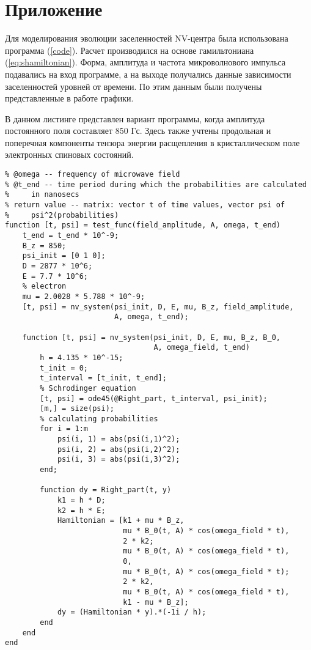 \newpage
\chapter*{Приложение}
Для моделирования эволюции заселенностей NV-центра была использована
программа (\ref{code}). Расчет производился на основе
гамильтониана (\ref{eq:shamiltonian}). Форма, амплитуда и частота микроволнового
импульса подавались на вход программе, а на выходе получались данные
зависимости заселенностей уровней от времени. По этим данным были
получены представленные в работе графики.

В данном листинге представлен вариант программы, когда амплитуда
постоянного поля составляет 850 Гс. Здесь также учтены продольная и
поперечная компоненты тензора энергии расщепления в кристаллическом
поле электронных спиновых состояний.
\begin{lstlisting}[label=code, caption=NV-center model]
% @field_amplitude -- function(t) of amplitude of microwave field
% @omega -- frequency of microwave field
% @t_end -- time period during which the probabilities are calculated
%     in nanosecs
% return value -- matrix: vector t of time values, vector psi of
%     psi^2(probabilities)
function [t, psi] = test_func(field_amplitude, A, omega, t_end)
    t_end = t_end * 10^-9;
    B_z = 850;
    psi_init = [0 1 0];
    D = 2877 * 10^6;
    E = 7.7 * 10^6;
    % electron
    mu = 2.0028 * 5.788 * 10^-9;
    [t, psi] = nv_system(psi_init, D, E, mu, B_z, field_amplitude, 
                         A, omega, t_end);

    function [t, psi] = nv_system(psi_init, D, E, mu, B_z, B_0, 
                                  A, omega_field, t_end)
        h = 4.135 * 10^-15;
        t_init = 0;
        t_interval = [t_init, t_end];
        % Schrodinger equation    
        [t, psi] = ode45(@Right_part, t_interval, psi_init);
        [m,] = size(psi);
        % calculating probabilities
        for i = 1:m
            psi(i, 1) = abs(psi(i,1)^2);
            psi(i, 2) = abs(psi(i,2)^2);
            psi(i, 3) = abs(psi(i,3)^2);
        end;
    
        function dy = Right_part(t, y)
            k1 = h * D;
            k2 = h * E;
            Hamiltonian = [k1 + mu * B_z, 
                           mu * B_0(t, A) * cos(omega_field * t), 
                           2 * k2; 
                           mu * B_0(t, A) * cos(omega_field * t), 
                           0, 
                           mu * B_0(t, A) * cos(omega_field * t);
                           2 * k2, 
                           mu * B_0(t, A) * cos(omega_field * t), 
                           k1 - mu * B_z];
            dy = (Hamiltonian * y).*(-1i / h);
        end
    end
end
\end{lstlisting}

